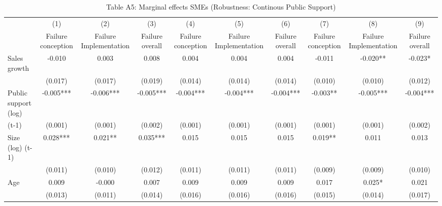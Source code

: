 \begin{table}[htbp]\centering
\def\sym#1{\ifmmode^{#1}\else\(^{#1}\)\fi}
\caption{{Table A5: Marginal effects SMEs (Robustness: Continous Public Support)}}
\begin{tabular}{l*{9}{c}}
\hline\hline
                    &\multicolumn{1}{c}{(1)}&\multicolumn{1}{c}{(2)}&\multicolumn{1}{c}{(3)}&\multicolumn{1}{c}{(4)}&\multicolumn{1}{c}{(5)}&\multicolumn{1}{c}{(6)}&\multicolumn{1}{c}{(7)}&\multicolumn{1}{c}{(8)}&\multicolumn{1}{c}{(9)}\\
                    &\multicolumn{1}{c}{Failure conception}&\multicolumn{1}{c}{Failure Implementation}&\multicolumn{1}{c}{Failure overall}&\multicolumn{1}{c}{Failure conception}&\multicolumn{1}{c}{Failure Implementation}&\multicolumn{1}{c}{Failure overall}&\multicolumn{1}{c}{Failure conception}&\multicolumn{1}{c}{Failure Implementation}&\multicolumn{1}{c}{Failure overall}\\
\hline
Sales growth        &      -0.010   &       0.003   &       0.008   &       0.004   &       0.004   &       0.004   &      -0.011   &      -0.020** &      -0.023*  \\
                    &     (0.017)   &     (0.017)   &     (0.019)   &     (0.014)   &     (0.014)   &     (0.014)   &     (0.010)   &     (0.010)   &     (0.012)   \\
Public support (log)&      -0.005***&      -0.006***&      -0.005***&      -0.004***&      -0.004***&      -0.004***&      -0.003** &      -0.005***&      -0.004***\\
(t-1)               &     (0.001)   &     (0.001)   &     (0.002)   &     (0.001)   &     (0.001)   &     (0.001)   &     (0.001)   &     (0.001)   &     (0.002)   \\
Size (log) (t-1)    &       0.028***&       0.021** &       0.035***&       0.015   &       0.015   &       0.015   &       0.019** &       0.011   &       0.013   \\
                    &     (0.011)   &     (0.010)   &     (0.012)   &     (0.011)   &     (0.011)   &     (0.011)   &     (0.009)   &     (0.009)   &     (0.010)   \\
Age                 &       0.009   &      -0.000   &       0.007   &       0.009   &       0.009   &       0.009   &       0.017   &       0.025*  &       0.021   \\
                    &     (0.013)   &     (0.011)   &     (0.014)   &     (0.016)   &     (0.016)   &     (0.016)   &     (0.015)   &     (0.014)   &     (0.017)   \\

\end{tabular}
\end{table}
